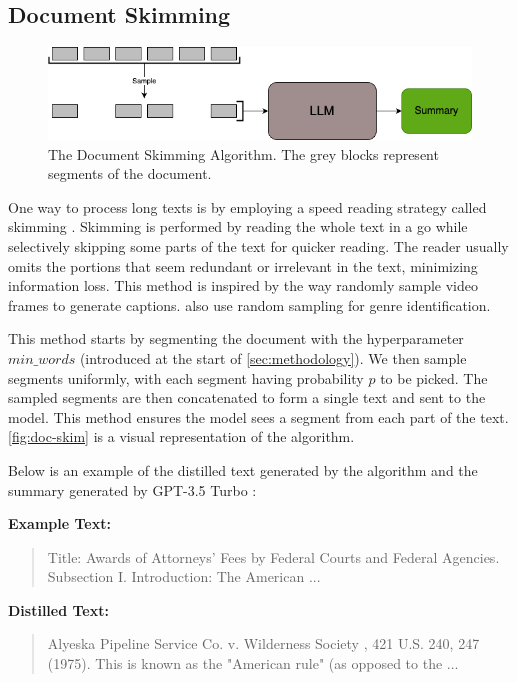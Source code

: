 \subsection{Document Skimming}
\label{method:skimming}

\begin{figure}[!ht]
  \centering
  \includegraphics[width=.8\textwidth]{images/doc-skim.png}
  \caption{The Document Skimming Algorithm. The grey blocks represent segments of the document.}
  \label{fig:doc-skim}
\end{figure}

One way to process long texts is by employing a speed reading strategy called skimming \cite{dhillon2020effect}.
Skimming is performed by reading the whole text in a go while selectively skipping some parts of the text for quicker reading.
The reader usually omits the portions that seem redundant or irrelevant in the text, minimizing information loss.
This method is inspired by the way \citet{wang2024videoagent} randomly sample video frames to generate captions.
\citet{worsham-kalita-2018-genre} also use random sampling for genre identification.

This method starts by segmenting the document with the hyperparameter $min\_words$ (introduced at the start of \autoref{sec:methodology}).
We then sample segments uniformly, with each segment having probability $p$ to be picked.
The sampled segments are then concatenated to form a single text and sent to the model.
This method ensures the model sees a segment from each part of the text.
\autoref{fig:doc-skim} is a visual representation of the algorithm.

Below is an example of the distilled text generated by the algorithm and the summary generated by GPT-3.5 Turbo \cite{brown2020language}:

\noindent \textbf{Example Text:}
\begin{quote}
  Title: Awards of Attorneys’ Fees by Federal Courts and Federal Agencies.
  Subsection I. Introduction: The American ...
\end{quote}

\noindent \textbf{Distilled Text:}
\begin{quote}
  Alyeska Pipeline Service Co. v. Wilderness Society , 421 U.S. 240, 247 (1975). This is known as the "American rule" (as opposed to the ...
\end{quote}

